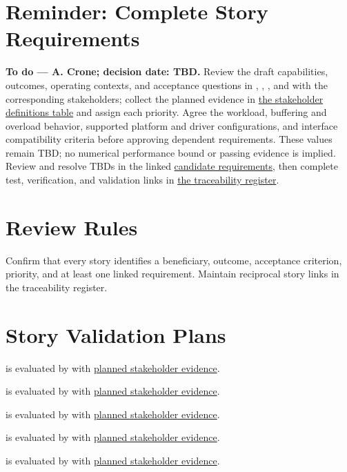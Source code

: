 \section{Reminder: Complete Story Requirements}
\label{Section:StoryRequirementsReminder}
\noindent\textbf{To do --- A. Crone; decision date: TBD.}
Review the draft capabilities, outcomes, operating contexts, and acceptance
questions in , ,
, and  with the corresponding
stakeholders; collect the planned evidence in
\hyperref[Table:StakeholderDefinitions]{the stakeholder definitions table}
and assign each priority. Agree the workload, buffering and overload behavior,
supported platform and driver configurations, and interface compatibility
criteria before approving dependent requirements. These values remain TBD;
no numerical performance bound or passing evidence is implied.
Review and resolve TBDs in the linked
\hyperref[Section:PendingStoryRequirements]{candidate requirements}, then
complete test, verification, and validation links in
\hyperref[Table:TraceabilityMatrix]{the traceability register}.

\section{Review Rules}
Confirm that every story identifies a beneficiary, outcome, acceptance
criterion, priority, and at least one linked requirement. Maintain reciprocal
story links in the traceability register.

\section{Story Validation Plans}
 is evaluated by  with \hyperref[PlannedEvidence:VAL-004]{planned stakeholder evidence}.

 is evaluated by  with \hyperref[PlannedEvidence:VAL-005]{planned stakeholder evidence}.

 is evaluated by  with \hyperref[PlannedEvidence:VAL-006]{planned stakeholder evidence}.

 is evaluated by  with \hyperref[PlannedEvidence:VAL-007]{planned stakeholder evidence}.

 is evaluated by  with \hyperref[PlannedEvidence:VAL-008]{planned stakeholder evidence}.

